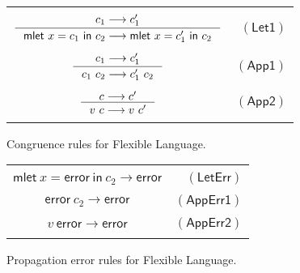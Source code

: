 \documentclass[preprint,authoryear,sort&compress,9pt,nocopyrightspace]{article}
\newcommand\rulename[1]{\mathsf{(#1)}}
\newcommand{\tto}{\longrightarrow}
\newcommand{\oletP}[3]{\mathsf{mlet} \ x = #2 \ \mathsf{in}  \ #3}
\newcommand{\errorA}{\mathsf{error}}
\newcommand{\semanticA}{Flexible Language}
\begin{document}
\begin{figure}[h]
\begin{small}
\begin{center}
\begin{tabular}{|c r|}
\hline
&\\
$ \inference {c_1 \tto c_1'}{\oletP{T_1}{c_1}{c_2} \tto \oletP{T_1}{c_1'}{c_2} }$&$\rulename{Let1} $\\
&\\
$\inference {c_1 \tto c_1'}{c_1 \ c_2 \tto c_1' \ c_2} $&$\rulename{App1}  $\\
&\\
$ \inference {c \tto c'}{v \ c \tto v \ c'}$&$\rulename{App2}  $\\
&\\
\hline
\end{tabular}
\caption{Congruence rules for \semanticA.}
\label{tabla:congruenceRules}
\end{center}
\end{small}
\end{figure}

\begin{figure}[h]
\begin{small}
\begin{center}
\begin{tabular}{|c r|}
\hline
&\\
$ {\oletP{T_1}{\errorA}{c_2} \tto \errorA  }$&$\rulename{LetErr} $\\
&\\
${\errorA \ c_2 \tto \errorA} $&$\rulename{AppErr1}  $\\
&\\
$ {v \ \errorA \tto \errorA}$&$\rulename{AppErr2}  $\\
&\\
\hline
\end{tabular}
\caption{Propagation error rules for \semanticA.}
\label{tabla:errorRules}
\end{center}
\end{small}
\end{figure}
\end{document}

